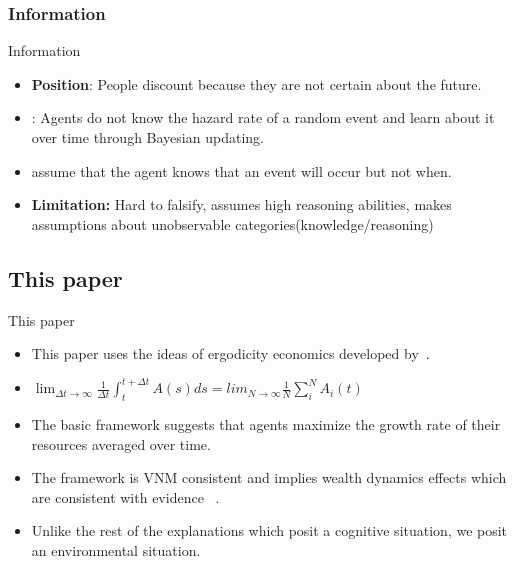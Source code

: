 \documentclass{beamer}
\numberwithin{equation}{section}
\begin{document}
\subsubsection{Information}
\begin{frame}{Information}
\begin{itemize}
    \item \textbf{Position}: People discount because they are not certain about the future. 
    \item  \citet{Sozou1998}: Agents do not know the hazard rate of a random event and learn about it over time through Bayesian updating.  
    \item \citet{dasgupta2005uncertainty} assume that the agent knows that an event will occur but not when. 
    \item \textbf{Limitation:} Hard to falsify, assumes high reasoning abilities, makes assumptions about unobservable categories(knowledge/reasoning)
\end{itemize}
\end{frame}

\subsection{This paper}
\begin{frame}{This paper}
\begin{itemize}
    \item This paper uses the ideas of ergodicity economics developed by~\citep{PetersAdamou2018a, berman2016far}. 
    \item $\lim_{\Delta t \rightarrow \infty} \frac{1}{\Delta t} \int^{t+\Delta t}_t A(s)ds =lim_{N \rightarrow \infty} \frac{1}{N} \sum_i^N A_i(t)$
    \item The basic framework suggests that agents maximize the growth rate of their resources averaged over time. 
    \item The framework is VNM consistent and implies wealth dynamics effects which are consistent with evidence ~\citep{MederETAL2019}.
    \item Unlike the rest of the explanations which posit a cognitive situation, we posit an environmental situation. 
\end{itemize}
\end{frame}

\end{document}
